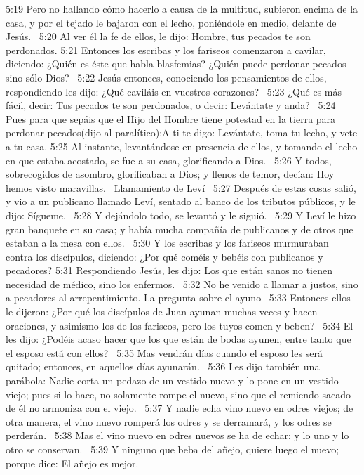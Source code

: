 5:19 Pero no hallando cómo hacerlo a causa de la multitud, subieron encima de la casa, y por el tejado le bajaron con el lecho, poniéndole en medio, delante de Jesús.  
5:20 Al ver él la fe de ellos, le dijo: Hombre, tus pecados te son perdonados. 
5:21 Entonces los escribas y los fariseos comenzaron a cavilar, diciendo: ¿Quién es éste que habla blasfemias? ¿Quién puede perdonar pecados sino sólo Dios?  
5:22 Jesús entonces, conociendo los pensamientos de ellos, respondiendo les dijo: ¿Qué caviláis en vuestros corazones?  
5:23 ¿Qué es más fácil, decir: Tus pecados te son perdonados, o decir: Levántate y anda?  
5:24 Pues para que sepáis que el Hijo del Hombre tiene potestad en la tierra para perdonar pecados(dijo al paralítico):A ti te digo: Levántate, toma tu lecho, y vete a tu casa. 
5:25 Al instante, levantándose en presencia de ellos, y tomando el lecho en que estaba acostado, se fue a su casa, glorificando a Dios.  
5:26 Y todos, sobrecogidos de asombro, glorificaban a Dios; y llenos de temor, decían: Hoy hemos visto maravillas.  
Llamamiento de Leví   
5:27 Después de estas cosas salió, y vio a un publicano llamado Leví, sentado al banco de los tributos públicos, y le dijo: Sígueme.  
5:28 Y dejándolo todo, se levantó y le siguió.  
5:29 Y Leví le hizo gran banquete en su casa; y había mucha compañía de publicanos y de otros que estaban a la mesa con ellos.  
5:30 Y los escribas y los fariseos murmuraban contra los discípulos, diciendo: ¿Por qué coméis y bebéis con publicanos y pecadores? 
5:31 Respondiendo Jesús, les dijo: Los que están sanos no tienen necesidad de médico, sino los enfermos.  
5:32 No he venido a llamar a justos, sino a pecadores al arrepentimiento. 
La pregunta sobre el ayuno   
5:33 Entonces ellos le dijeron: ¿Por qué los discípulos de Juan ayunan muchas veces y hacen oraciones, y asimismo los de los fariseos, pero los tuyos comen y beben?  
5:34 El les dijo: ¿Podéis acaso hacer que los que están de bodas ayunen, entre tanto que el esposo está con ellos?  
5:35 Mas vendrán días cuando el esposo les será quitado; entonces, en aquellos días ayunarán.  
5:36 Les dijo también una parábola: Nadie corta un pedazo de un vestido nuevo y lo pone en un vestido viejo; pues si lo hace, no solamente rompe el nuevo, sino que el remiendo sacado de él no armoniza con el viejo.  
5:37 Y nadie echa vino nuevo en odres viejos; de otra manera, el vino nuevo romperá los odres y se derramará, y los odres se perderán.  
5:38 Mas el vino nuevo en odres nuevos se ha de echar; y lo uno y lo otro se conservan.  
5:39 Y ninguno que beba del añejo, quiere luego el nuevo; porque dice: El añejo es mejor.  
